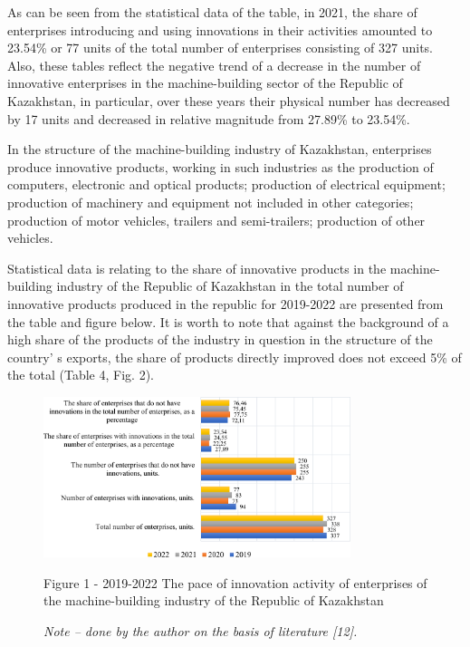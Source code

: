 \begin{multicols}{2}
As can be seen from the statistical data of the table, in 2021, the
share of enterprises introducing and using innovations in their
activities amounted to 23.54\% or 77 units of the total number of
enterprises consisting of 327 units. Also, these tables reflect the
negative trend of a decrease in the number of innovative enterprises in
the machine-building sector of the Republic of Kazakhstan, in
particular, over these years their physical number has decreased by 17
units and decreased in relative magnitude from 27.89\% to 23.54\%.

In the structure of the machine-building industry of Kazakhstan,
enterprises produce innovative products, working in such industries as
the production of computers, electronic and optical products; production
of electrical equipment; production of machinery and equipment not
included in other categories; production of motor vehicles, trailers and
semi-trailers; production of other vehicles.

Statistical data is relating to the share of innovative products in the
machine-building industry of the Republic of Kazakhstan in the total
number of innovative products produced in the republic for 2019-2022 are
presented from the table and figure below. It is worth to note that
against the background of a high share of the products of the industry
in question in the structure of the country' s exports,
the share of products directly improved does not exceed 5\% of the total
(Table 4, Fig. 2).
\end{multicols}

\begin{figure}[H]
	\centering
	\includegraphics[width=0.8\textwidth]{media/ekon/Graph_6}
	\caption*{Figure 1 - 2019-2022 The pace of innovation activity of enterprises of the machine-building industry of the Republic of Kazakhstan}
	\caption*{\normalfont \emph{Note -- done by the author on the basis of literature {[}12{]}.}}
\end{figure}

